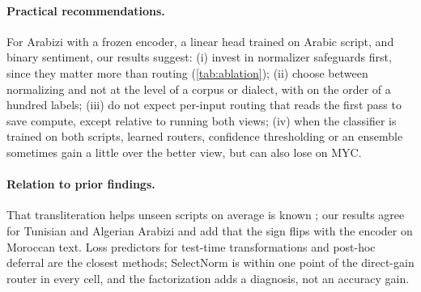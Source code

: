 \paragraph{Practical recommendations.}
For Arabizi with a frozen encoder, a linear head trained on Arabic script, and binary sentiment, our results suggest: (i) invest in normalizer safeguards first, since they matter more than routing (\cref{tab:ablation}); (ii) choose between normalizing and not at the level of a corpus or dialect, with on the order of a hundred labels; (iii) do not expect per-input routing that reads the first pass to save compute, except relative to running both views; (iv) when the classifier is trained on both scripts, learned routers, confidence thresholding or an ensemble sometimes gain a little over the better view, but can also lose on MYC.

\paragraph{Relation to prior findings.}
That transliteration helps unseen scripts on average is known \citep{muller2021unseen,moosa2023transliteration}; our results agree for Tunisian and Algerian Arabizi and add that the sign flips with the encoder on Moroccan text. Loss predictors for test-time transformations \citep{kim2020learningloss} and post-hoc deferral \citep{jitkrittum2023cascade} are the closest methods; SelectNorm is within one point of the direct-gain router in every cell, and the factorization adds a diagnosis, not an accuracy gain.
